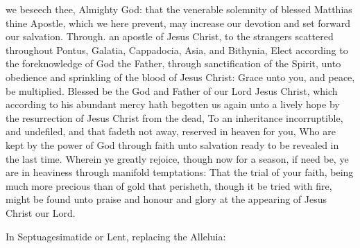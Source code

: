  we beseech thee, Almighty God: that the venerable solemnity of blessed Matthias thine Apostle, which we here prevent, may increase our devotion and set forward our salvation. Through.
 an apostle of Jesus Christ, to the strangers scattered throughout Pontus, Galatia, Cappadocia, Asia, and Bithynia, Elect according to the foreknowledge of God the Father, through sanctification of the Spirit, unto obedience and sprinkling of the blood of Jesus Christ: Grace unto you, and peace, be multiplied. Blessed be the God and Father of our Lord Jesus Christ, which according to his abundant mercy hath begotten us again unto a lively hope by the resurrection of Jesus Christ from the dead, To an inheritance incorruptible, and undefiled, and that fadeth not away, reserved in heaven for you, Who are kept by the power of God through faith unto salvation ready to be revealed in the last time. Wherein ye greatly rejoice, though now for a season, if need be, ye are in heaviness through manifold temptations: That the trial of your faith, being much more precious than of gold that perisheth, though it be tried with fire, might be found unto praise and honour and glory at the appearing of Jesus Christ our Lord.


\begin{rubric}
{In Septuagesimatide or Lent, replacing the Alleluia:}
\end{rubric}\par\noindent


